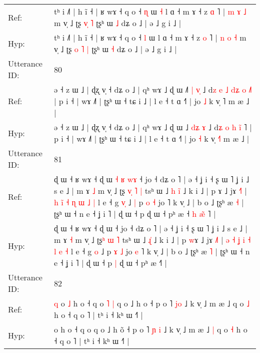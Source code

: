 \documentclass[10pt]{article}
\DeclareRobustCommand{\hl}[1]{{\textcolor{red}{#1}}}
\begin{document}
\begin{longtable}{ll}
Ref: & tʰ i ˩˥ | h ĩ ˧ | ʁ wɤ ˧ q o ˧ \hl{ɳ} ɯ\hl{ }\hl{˧} l ɑ ˧ m ɤ ˧ z \hl{ɑ} ˥ | \hl{m} \hl{ɤ} \hl{˩} m v̩ ˩ ʈʂ \hl{}\hl{v}\hl{̩} \hl{˥} ʈʂʰ ɯ \hl{˩} dʑ o ˩ | ə ˩ g i ˩ |
 \\
Hyp: & tʰ i ˩˥ | h ĩ ˧ | ʁ wɤ ˧ q o ˧ \hl{l} ɯ\hl{}\hl{} l ɑ ˧ m ɤ ˧ z \hl{o} ˥ | \hl{n} \hl{o} \hl{˧} m v̩ ˩ ʈʂ \hl{o}\hl{ }\hl{˥} \hl{|} ʈʂʰ ɯ \hl{˧} dʑ o ˩ | ə ˩ g i ˩ |
 \\
\midrule
Utterance ID: & 80 \\
Ref: & ə ˧ z ɯ ˩ | ɖʐ v̩ ˧ dʑ o ˩ | qʰ wɤ ˩ ɖ ɯ ˩\hl{˥} \hl{|}\hl{ }\hl{v}\hl{̩} ˩ d\hl{z} \hl{e} \hl{˩} \hl{d}\hl{ʑ}\hl{ }\hl{o} \hl{˩}˥ | p i ˧ | wɤ ˩˥ | ʈʂʰ ɯ ˧ tɕ i ˩ | l e ˧ t ɑ ˧˥ | jo \hl{˩} k v̩ \hl{}˥ m æ ˩ |
 \\
Hyp: & ə ˧ z ɯ ˩ | ɖʐ v̩ ˧ dʑ o ˩ | qʰ wɤ ˩ ɖ ɯ ˩\hl{} \hl{d}\hl{ʑ}\hl{ }\hl{ɤ} ˩ d\hl{ʑ} \hl{o} \hl{h} \hl{}\hl{}\hl{i}\hl{̃} \hl{}˥ | p i ˧ | wɤ ˩˥ | ʈʂʰ ɯ ˧ tɕ i ˩ | l e ˧ t ɑ ˧˥ | jo \hl{˧} k v̩ \hl{˧}˥ m æ ˩ |
 \\
\midrule
Utterance ID: & 81 \\
Ref: & ɖ ɯ ˧ ʁ wɤ ˧ ɖ ɯ\hl{ }\hl{˧}\hl{ }\hl{ʁ}\hl{ }\hl{w}\hl{ɤ} ˧ jo ˧ dʑ o ˥ | ə ˧ ʝ i ˧ ʂ ɯ ˥ ʝ i ˩ s e ˩ | m ɤ \hl{˩} m v̩ ˩ ʈʂ\hl{ }\hl{v}\hl{̩} \hl{˥} \hl{|} tsʰ ɯ ˩\hl{ }\hl{h} \hl{i}\hl{̃} ˩ k i ˩ | p \hl{}ɤ ˩ jɤ \hl{˧}˥ | \hl{h} \hl{}\hl{i}\hl{̃} \hl{˧} \hl{ɳ} \hl{ɯ} \hl{˩} \hl{|} l e ˧ g \hl{v}\hl{̩} ˩\hl{ }\hl{|} p \hl{o} \hl{˧} jo\hl{}\hl{} ˥ k v̩ ˩ | b o ˩ ʈʂʰ æ \hl{˧} | ʈʂʰ ɯ ˧ n e ˧ ʝ i ˥ | ɖ ɯ ˧ p\hl{}\hl{} ɖ ɯ ˧ pʰ æ ˧\hl{ }\hl{h}\hl{ }\hl{æ}\hl{̃}\hl{ }˥ |
 \\
Hyp: & ɖ ɯ ˧ ʁ wɤ ˧ ɖ ɯ\hl{}\hl{}\hl{}\hl{}\hl{}\hl{}\hl{} ˧ jo ˧ dʑ o ˥ | ə ˧ ʝ i ˧ ʂ ɯ ˥ ʝ i ˩ s e ˩ | m ɤ \hl{˧} m v̩ ˩ ʈʂ\hl{}\hl{}\hl{ʰ} \hl{ɯ} \hl{˥} tsʰ ɯ ˩\hl{}\hl{} \hl{ɻ}\hl{̍} ˩ k i ˩ | p \hl{w}ɤ ˩ jɤ \hl{˩}˥ | \hl{ə} \hl{˧}\hl{ }\hl{ʝ} \hl{i} \hl{˧} \hl{l} \hl{e} \hl{˧} l e ˧ g \hl{}\hl{o} ˩\hl{}\hl{} p \hl{ɤ} \hl{˩} jo\hl{ }\hl{e} ˥ k v̩ ˩ | b o ˩ ʈʂʰ æ \hl{˥} | ʈʂʰ ɯ ˧ n e ˧ ʝ i ˥ | ɖ ɯ ˧ p\hl{ }\hl{|} ɖ ɯ ˧ pʰ æ ˧\hl{}\hl{}\hl{}\hl{}\hl{}\hl{}˥ |
 \\
\midrule
Utterance ID: & 82 \\
Ref: & \hl{q}\hl{ }o\hl{ }\hl{˩} h o ˧ q o\hl{ }\hl{˥}\hl{ }\hl{|} q o ˩ h o\hl{} ˧ p o ˥ \hl{}\hl{j}\hl{o} ˩ k v̩ ˩ m æ ˩\hl{}\hl{} q o \hl{˩} h o ˧ q o ˥ | tʰ i ˧ kʰ ɯ ˧˥ |
 \\
Hyp: & \hl{}\hl{}o\hl{}\hl{} h o ˧ q o\hl{}\hl{}\hl{}\hl{} q o ˩ h o\hl{̃} ˧ p o ˥ \hl{ɲ}\hl{ }\hl{i} ˩ k v̩ ˩ m æ ˩\hl{ }\hl{|} q o \hl{˧} h o ˧ q o ˥ | tʰ i ˧ kʰ ɯ ˧˥ |
 \\

\end{longtable}
\end{document}
